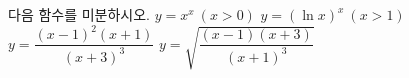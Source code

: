 다음 함수를 미분하시오.
 $y=x^x\ (x>0)$
 $y=(\ln x)^x\ (x>1)$
 $y=\dfrac{(x-1)^2(x+1)}{(x+3)^3}$
 $y=\sqrt{\dfrac{(x-1)(x+3)}{(x+1)^3}}$
